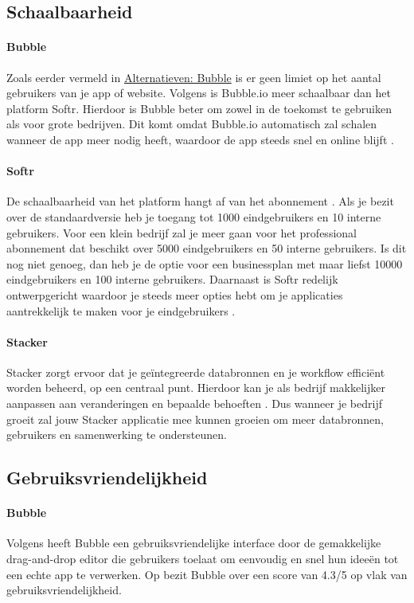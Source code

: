 \subsection{Schaalbaarheid}%
\label{subsec:schaalbaarheid}
\paragraph{Bubble}
Zoals eerder vermeld in \hyperref[subsec:bubble]{Alternatieven: Bubble} is er geen limiet op het aantal gebruikers van je app of website. Volgens \textcite{Youssef2023} is 
Bubble.io meer schaalbaar dan het platform Softr. Hierdoor is Bubble beter om zowel in de toekomst te gebruiken als voor grote bedrijven. 
Dit komt omdat Bubble.io automatisch zal schalen wanneer de app meer nodig heeft, 
waardoor de app steeds snel en online blijft \autocite{Bas2024}.
\paragraph{Softr}
De schaalbaarheid van het platform hangt af van het abonnement \autocite{Frater2024}. 
Als je bezit over de standaardversie heb je toegang tot 1000 eindgebruikers en 10 interne gebruikers. 
Voor een klein bedrijf zal je meer gaan voor het professional abonnement dat beschikt over 5000 eindgebruikers en 50 interne gebruikers. Is dit nog niet genoeg, 
dan heb je de optie voor een businessplan met maar liefst 10000 eindgebruikers en 100 interne gebruikers. Daarnaast is Softr redelijk ontwerpgericht waardoor je steeds 
meer opties hebt om je applicaties aantrekkelijk te maken voor je eindgebruikers \autocite{Noloco2023}.
\paragraph{Stacker}
Stacker zorgt ervoor dat je geïntegreerde databronnen en je workflow efficiënt worden beheerd, op een centraal punt. Hierdoor kan je als bedrijf makkelijker aanpassen aan veranderingen en 
bepaalde behoeften \autocite{Noloco2023}. Dus wanneer je bedrijf groeit zal jouw Stacker applicatie mee kunnen groeien om meer databronnen, gebruikers en samenwerking te ondersteunen.
\subsection{Gebruiksvriendelijkheid}%
\label{subsec:gebruiksvriendelijkheid}
\paragraph{Bubble}
Volgens \textcite{Czerny2024} 
heeft Bubble een gebruiksvriendelijke interface door de gemakkelijke drag-and-drop editor die gebruikers toelaat om eenvoudig en snel hun ideeën tot een echte app te verwerken. 
Op \textcite{Capterra} bezit Bubble over een score van 4.3/5 op vlak van gebruiksvriendelijkheid.
